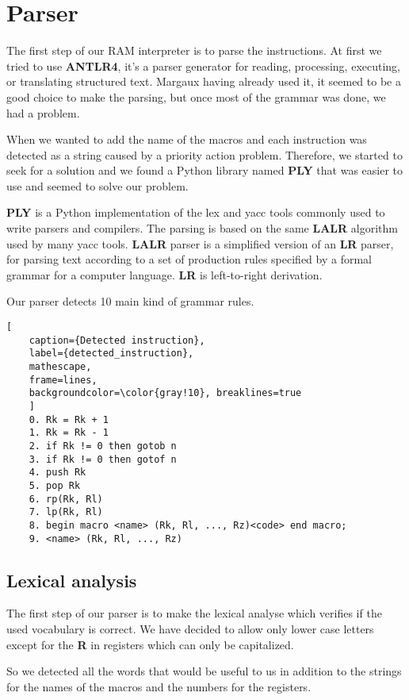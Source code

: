 \section{Parser}
\label{sec:parser}
The first step of our RAM interpreter is to parse the instructions. At first we tried to use \textbf{ANTLR4}, it's a parser generator for reading, processing, executing, or translating structured text. Margaux having already used it, it seemed to be a good choice to make the parsing, but once most of the grammar was done, we had a problem.

When we wanted to add the name of the macros and each instruction was detected as a string caused by a priority action problem. Therefore, we started to seek for a solution and we found a Python library named \textbf{PLY} that was easier to use and seemed to solve our problem.

\textbf{PLY} is a Python implementation of the lex and yacc tools commonly used to write parsers and compilers. The parsing is based on the same \textbf{LALR} algorithm used by many yacc tools. \textbf{LALR} parser is a simplified version of an \textbf{LR} parser, for parsing text according to a set of production rules specified by a formal grammar for a computer language. \textbf{LR} is left-to-right derivation.

Our parser detects 10 main kind of grammar rules.

\begin{lstlisting}[
    caption={Detected instruction}, 
    label={detected_instruction},
    mathescape, 
    frame=lines,
    backgroundcolor=\color{gray!10}, breaklines=true
    ]
    0. Rk = Rk + 1
    1. Rk = Rk - 1
    2. if Rk != 0 then gotob n
    3. if Rk != 0 then gotof n
    4. push Rk
    5. pop Rk
    6. rp(Rk, Rl)
    7. lp(Rk, Rl)
    8. begin macro <name> (Rk, Rl, ..., Rz)<code> end macro;
    9. <name> (Rk, Rl, ..., Rz)
\end{lstlisting}

\subsection{Lexical analysis}
The first step of our parser is to make the lexical analyse which verifies if the used vocabulary is correct. We have decided to allow only lower case letters except for the \textbf{R} in registers which can only be capitalized.

So we detected all the words that would be useful to us in addition to the strings for the names of the macros and the numbers for the registers.

